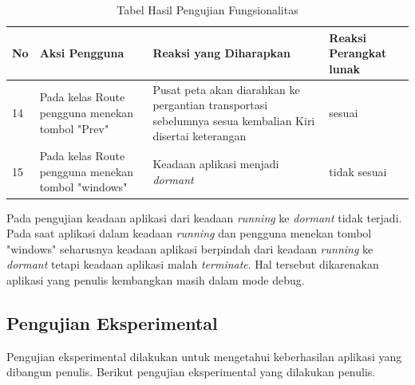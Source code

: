 \begin{table}[h!]
	\centering
		\begin{tabular}{|p{1cm}|p{4cm}|p{6cm}|p{3cm}|}\hline
				No & Aksi Pengguna & Reaksi yang Diharapkan & Reaksi Perangkat lunak \\ \hline
				14 & Pada kelas Route pengguna menekan tombol "Prev" & Pusat peta akan diarahkan ke pergantian transportasi sebelumnya sesua kembalian Kiri disertai keterangan & sesuai \\ \hline
				15 & Pada kelas Route pengguna menekan tombol "windows" & Keadaan aplikasi menjadi \textit{dormant} & tidak sesuai \\ \hline
		\end{tabular}
	\caption{Tabel Hasil Pengujian Fungsionalitas}
	\label{tab:TabelHasilPengujianFungsionalitas}
\end{table}
\fi

\hspace{0.5cm} Pada pengujian keadaan aplikasi dari keadaan \textit{running} ke \textit{dormant} tidak terjadi. Pada saat aplikasi dalam keadaan \textit{running} dan pengguna menekan tombol "windows" seharusnya keadaan aplikasi berpindah dari keadaan \textit{running} ke \textit{dormant} tetapi keadaan aplikasi malah \textit{terminate}. Hal tersebut dikarenakan aplikasi yang penulis kembangkan masih dalam mode debug.

\newpage
\subsection{Pengujian Eksperimental}
\label{lab:Pengujian Eksperimental}
\hspace{0.5cm} Pengujian eksperimental dilakukan untuk mengetahui keberhasilan aplikasi yang dibangun penulis. Berikut pengujian eksperimental yang dilakukan penulis.

